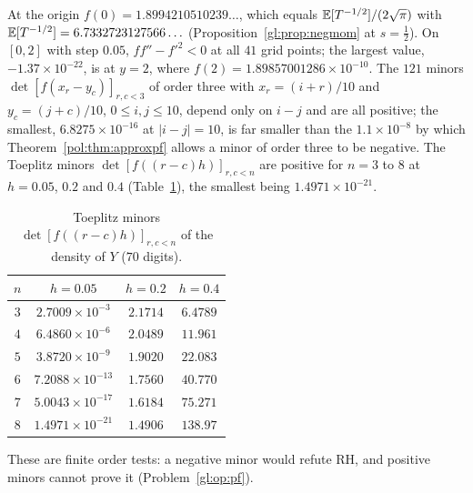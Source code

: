At the origin $f(0)=1.8994210510239\ldots$, which equals $\mathbb{E}[T^{-1/2}]/(2\sqrt\pi)$ with $\mathbb{E}[T^{-1/2}]=6.7332723127566\ldots$ (Proposition~\ref{gl:prop:negmom} at $s=\tfrac12$). On $[0,2]$ with step $0.05$, $ff''-f'^2<0$ at all $41$ grid points; the largest value, $-1.37\times10^{-22}$, is at $y=2$, where $f(2)=1.89857001286\times10^{-10}$. The $121$ minors $\det[f(x_r-y_c)]_{r,c<3}$ of order three with $x_r=(i+r)/10$ and $y_c=(j+c)/10$, $0\le i,j\le10$, depend only on $i-j$ and are all positive; the smallest, $6.8275\times10^{-16}$ at $|i-j|=10$, is far smaller than the $1.1\times10^{-8}$ by which Theorem~\ref{pol:thm:approxpf} allows a minor of order three to be negative. The Toeplitz minors $\det[f((r-c)h)]_{r,c<n}$ are positive for $n=3$ to $8$ at $h=0.05$, $0.2$ and $0.4$ (Table~\ref{gl:tab:toeplitz}), the smallest being $1.4971\times10^{-21}$.
\begin{table}[htbp]
\caption{Toeplitz minors $\det[f((r-c)h)]_{r,c<n}$ of the density of $Y$ ($70$ digits).}
\label{gl:tab:toeplitz}
\centering
\begin{tabular}{cccc}
\toprule
$n$ & $h=0.05$ & $h=0.2$ & $h=0.4$\\
\midrule
$3$ & $2.7009\times10^{-3}$ & $2.1714$ & $6.4789$\\
$4$ & $6.4860\times10^{-6}$ & $2.0489$ & $11.961$\\
$5$ & $3.8720\times10^{-9}$ & $1.9020$ & $22.083$\\
$6$ & $7.2088\times10^{-13}$ & $1.7560$ & $40.770$\\
$7$ & $5.0043\times10^{-17}$ & $1.6184$ & $75.271$\\
$8$ & $1.4971\times10^{-21}$ & $1.4906$ & $138.97$\\
\bottomrule
\end{tabular}
\end{table}
These are finite order tests: a negative minor would refute RH, and positive minors cannot prove it (Problem~\ref{gl:op:pf}).
